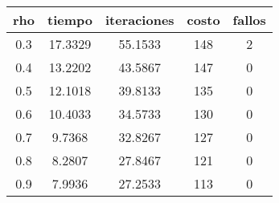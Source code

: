 \begin{table}[h!]
\centering
\begin{tabular}{ccccc}
rho & tiempo & iteraciones & costo & fallos \\ 
\hline 
0.3 & 17.3329 & 55.1533 & 148 & 2 \\ 
0.4 & 13.2202 & 43.5867 & 147 & 0 \\ 
0.5 & 12.1018 & 39.8133 & 135 & 0 \\ 
0.6 & 10.4033 & 34.5733 & 130 & 0 \\ 
0.7 & 9.7368 & 32.8267 & 127 & 0 \\ 
0.8 & 8.2807 & 27.8467 & 121 & 0 \\ 
0.9 & 7.9936 & 27.2533 & 113 & 0 \\ 
\hline 
\end{tabular}
\end{table}